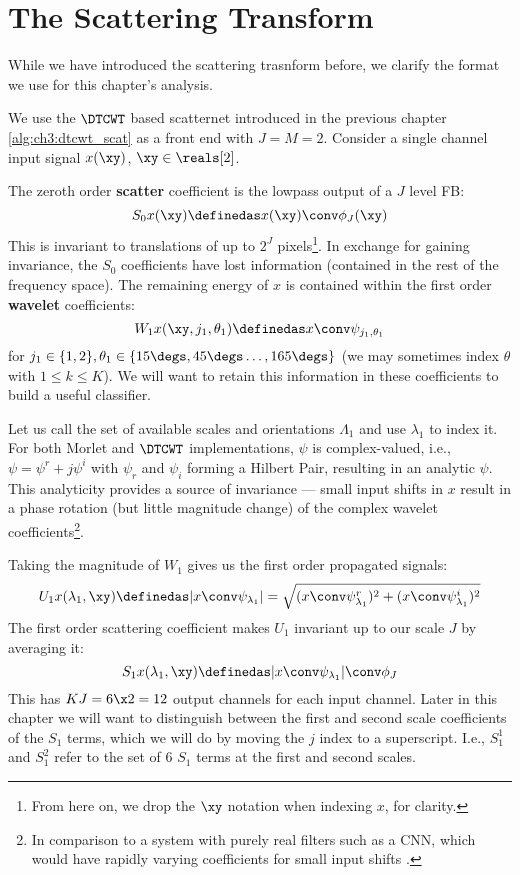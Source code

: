 \section{The Scattering Transform} \label{sec:ch4:scatternet}
While we have introduced the scattering trasnform before, we clarify the format
we use for this chapter's analysis. 

We use the $\DTCWT$ based scatternet introduced in the previous chapter 
\autoref{alg:ch3:dtcwt_scat} as a front end  with $J=M=2$. Consider a single
channel input signal $x(\xy)$, $\xy \in \reals[2]$.

The zeroth order \textbf{scatter} coefficient is the lowpass output of a $J$
level FB: 
\begin{equation}
  S_0x(\xy) \definedas x(\xy) \conv \phi_J(\xy)
\end{equation}
This is invariant to translations of up to $2^J$ pixels\footnote{From here on,
we drop the $\xy$ notation when indexing $x$, for clarity.}. In exchange for
gaining invariance, the $S_0$ coefficients have lost information
(contained in the rest of the frequency space). The remaining energy of $x$ is
contained within the first order \textbf{wavelet} coefficients:
\begin{equation}
  W_1x(\xy, j_1, \theta_1) \definedas x \conv \psi_{j_1, \theta_1}
\end{equation}
for $j_1\in\{1, 2\}, \theta_1\in\{15\degs, 45\degs \ldots, 165\degs\}$ (we may 
sometimes index $\theta$ with $1 \leq k \leq K$). We will want to
retain this information in these coefficients to build a useful classifier.

Let us call the set of available scales and orientations $\Lambda_1$ and use
$\lambda_1$ to index it. For both Morlet and $\DTCWT$ implementations, $\psi$
is complex-valued, i.e., $\psi = \psi^r + j\psi^i$ with $\psi_r$ and $\psi_i$
forming a Hilbert Pair, resulting in an analytic $\psi$.
 This analyticity provides a source of invariance --- small input shifts in $x$
 result in a phase rotation (but little magnitude change) of the complex wavelet
 coefficients\footnote{In comparison to a system with purely real filters such
 as a CNN, which would have rapidly varying coefficients for small input shifts
 \cite{kingsbury_complex_2001}.}.

Taking the magnitude of $W_1$ gives us the first order propagated
signals:
\begin{equation}
  U_1x(\lambda_1, \xy) \definedas |x \conv \psi_{\lambda_1}| 
    = \sqrt{(x \conv \psi^r_{\lambda_1})^2 + (x \conv \psi^i_{\lambda_1})^2}
\end{equation}
The first order scattering coefficient makes $U_1$ invariant up to our
scale $J$ by averaging it:
\begin{equation}
  S_1x(\lambda_1, \xy) \definedas |x \conv \psi_{\lambda_1}| \conv \phi_J
\end{equation}
This has $KJ = 6\x 2 = 12$ output channels for each input channel. Later in this
chapter we will want to distinguish between the first and second scale
coefficients of the $S_1$ terms, which we will do by moving the $j$ index
to a superscript. I.e., $S_1^1$ and $S_1^2$ refer to the set of 6 $S_1$ terms
at the first and second scales.

